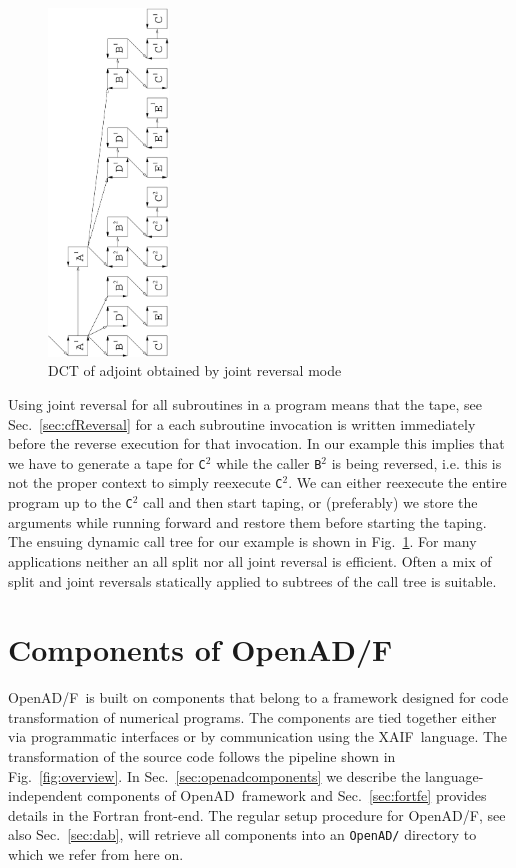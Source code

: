 \documentclass{book}
\newcommand{\OpenADF}{OpenAD/F}
\newcommand{\OpenAD}{OpenAD}
\newcommand{\xaif}{XAIF}
\newcommand{\code}[1]{{\small\tt{#1}}}
\newcommand{\refsec}[1]{{Sec.~\ref{#1}}}
\newcommand{\reffig}[1]{{Fig.~\ref{#1}}}
\begin{document}
\begin{figure}[t]
  \centerline{\includegraphics[width=3.2cm,origin=c,angle=-90]{edct_joint_ns}}
  \vspace*{-3cm}
  \caption{DCT of adjoint obtained by joint reversal mode}
  \label{fig:joint}
\end{figure}

Using joint reversal for all subroutines in a program 
means that the tape, see \refsec{sec:cfReversal} for a each 
subroutine invocation is written immediately before the reverse execution for 
that invocation. In our example this implies that we have to generate 
a tape for {\tt C}$^2$ while the caller {\tt B}$^2$ is being reversed, 
i.e. this is not the proper context to simply reexecute {\tt C}$^2$. 
We can either reexecute the entire program up to the  {\tt C}$^2$
call and then start taping, or (preferably) we store the arguments while 
running forward and restore them before starting the taping. 
The ensuing dynamic call tree for our example is 
shown in \reffig{fig:joint}. 
For many applications neither an all split nor all joint reversal
is efficient. Often a mix of split and joint reversals statically  
applied to subtrees of the call tree is suitable.  

\chapter{Components of \OpenADF}\label{chap:openadfcomponents}

\OpenADF\ is built on components that belong to a framework designed
for code transformation of numerical programs.  The components are
tied together either via programmatic interfaces or by communication
using the \xaif\ language. The transformation of the source code follows the
pipeline shown in \reffig{fig:overview}.  
In \refsec{sec:openadcomponents} we describe the language-independent 
components of \OpenAD\ framework and \refsec{sec:fortfe} provides details 
in the Fortran front-end.
The regular setup procedure for \OpenADF, see also \refsec{sec:dab}, 
will retrieve all components into an \code{OpenAD/} directory to which 
we refer from here on.  
\end{document}
